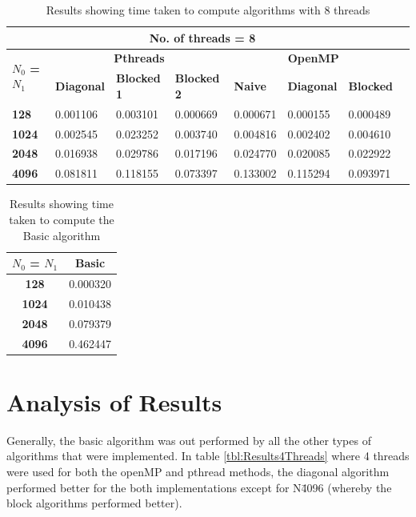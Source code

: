 \documentclass[10pt, onecolumn]{article}
\begin{document}
\begin{table}[H]
    \vspace{-0.5cm}
    \centering
    \caption{Results showing time taken to compute algorithms with 8 threads}
    \label{tbl:Results8Threads}
    \begin{tabular}{|l|l|l|l|l|l|l|l|}
    \hline
     \multicolumn{7}{|c|}{\textbf{No. of threads = 8}} \\ \hline
    \multirow{2}{*}{\textbf{$N_0$ = $N_1$}} & \multicolumn{3}{c|}{\textbf{Pthreads}} & \multicolumn{3}{c|}{\textbf{OpenMP}} \\ \cline{2-7} 
    & \textbf{Diagonal} & \textbf{Blocked 1} & \textbf{Blocked 2} & \textbf{Naive} & \textbf{Diagonal} & \textbf{Blocked} \\ \hline
    \textbf{128}  &0.001106  &0.003101  &0.000669  &0.000671  &0.000155  &0.000489  \\ \hline
    \textbf{1024} &0.002545  &0.023252  &0.003740  &0.004816  &0.002402  &0.004610  \\ \hline
    \textbf{2048} &0.016938  &0.029786  &0.017196  &0.024770  &0.020085  &0.022922  \\ \hline
    \textbf{4096} &0.081811  &0.118155  &0.073397  &0.133002  &0.115294  &0.093971  \\ \hline
    \end{tabular}
\end{table}
%
\begin{table}[H]
    \vspace{-0.5cm}
    \centering
    \caption{Results showing time taken to compute the Basic algorithm}
    \label{tbl:ResultBasic}
    \begin{tabular}{|c|c|}
    \hline
    $N_0$ = $N_1$ & Basic \\ \hline
    \textbf{128}        &0.000320       \\ \hline
    \textbf{1024}       &0.010438       \\ \hline
    \textbf{2048}       &0.079379       \\ \hline
    \textbf{4096}       &0.462447       \\ \hline
    \end{tabular}
\end{table}
\section{Analysis of Results}
%
Generally, the basic algorithm was out performed by all the other types of algorithms that were implemented. In table \ref{tbl:Results4Threads} where 4 threads were used for both the openMP and pthread methods, the diagonal algorithm performed better for the both implementations except for N\= 4096 (whereby the block algorithms performed better).  
%
\end{document}
